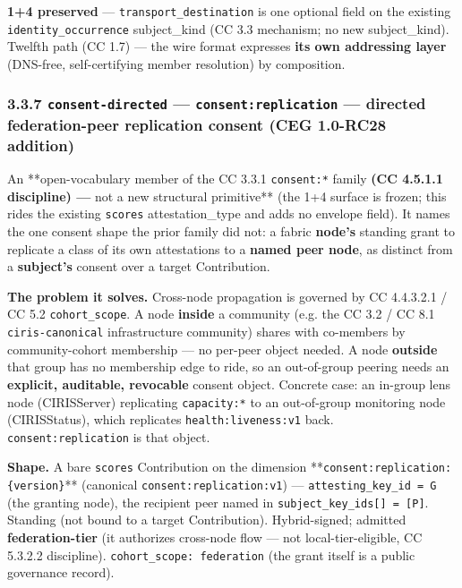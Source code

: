 \documentclass[11pt]{article}
\begin{document}
\textbf{1+4 preserved} — \texttt{transport\_destination} is one optional field on the existing \texttt{identity\_occurrence} subject\_kind (CC 3.3 mechanism; no new subject\_kind). Twelfth path (CC 1.7) — the wire format expresses \textbf{its own addressing layer} (DNS-free, self-certifying member resolution) by composition.


\subsubsection*{3.3.7 \texttt{consent-directed} — \texttt{consent:replication} — directed federation-peer replication consent (CEG 1.0-RC28 addition)}


An **open-vocabulary member of the CC 3.3.1 \texttt{consent:*} family\textbf{ (CC 4.5.1.1 discipline) — }not a new structural primitive** (the 1+4 surface is frozen; this rides the existing \texttt{scores} attestation\_type and adds no envelope field). It names the one consent shape the prior family did not: a fabric \textbf{node's} standing grant to replicate a class of its own attestations to a \textbf{named peer node}, as distinct from a \textbf{subject's} consent over a target Contribution.


\textbf{The problem it solves.} Cross-node propagation is governed by CC 4.4.3.2.1 / CC 5.2 \texttt{cohort\_scope}. A node \textbf{inside} a community (e.g. the CC 3.2 / CC 8.1 \texttt{ciris-canonical} infrastructure community) shares with co-members by community-cohort membership — no per-peer object needed. A node \textbf{outside} that group has no membership edge to ride, so an out-of-group peering needs an \textbf{explicit, auditable, revocable} consent object. Concrete case: an in-group lens node (CIRISServer) replicating \texttt{capacity:*} to an out-of-group monitoring node (CIRISStatus), which replicates \texttt{health:liveness:v1} back. \texttt{consent:replication} is that object.


\textbf{Shape.} A bare \texttt{scores} Contribution on the dimension **\texttt{consent:replication:\{version\}}** (canonical \texttt{consent:replication:v1}) — \texttt{attesting\_key\_id = G} (the granting node), the recipient peer named in \texttt{subject\_key\_ids[] = [P]}. Standing (not bound to a target Contribution). Hybrid-signed; admitted \textbf{federation-tier} (it authorizes cross-node flow — not local-tier-eligible, CC 5.3.2.2 discipline). \texttt{cohort\_scope: federation} (the grant itself is a public governance record).
\end{document}
